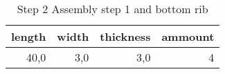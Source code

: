 \begin{table}[h!]
\centering
\caption{Step 2 Assembly step 1 and bottom rib}
\begin{tabular}{rrrr}
\toprule
 length &  width &  thickness &  ammount \\
\midrule
   40,0 &    3,0 &        3,0 &        4 \\
\bottomrule
\end{tabular}
\end{table}
